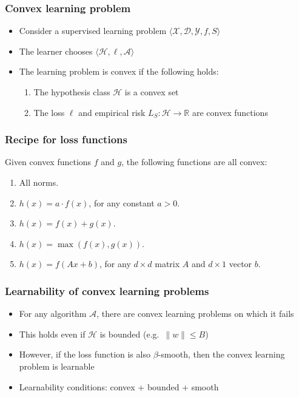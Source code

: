 \documentclass[10pt]{beamer}
\begin{document}
\begin{frame}
  \frametitle{Convex learning problem}
  \begin{itemize}
	\item Consider a supervised learning problem $\langle \mathcal{X},\mathcal{D},\mathcal{Y},f,S\rangle$
	\item The learner chooses $\langle \mathcal{H}, \ell, \mathcal{A} \rangle$
	\item The learning problem is {\color{red} convex} if the following holds:
	\begin{enumerate}
	\item The hypothesis class $\mathcal{H}$ is a {\color{red} convex set}
	\item The loss $\ell$ and empirical risk $L_S:\mathcal{H}\rightarrow\mathbb{R}$ are {\color{red} convex functions}
	\end{enumerate}
  \end{itemize}
\end{frame}

\begin{frame}
  \frametitle{Recipe for loss functions}
  Given convex functions $f$ and $g$, the following functions are all convex:
  \begin{enumerate}
	\item All norms.
	\item $h(x) = a\cdot f(x)$, for any constant $a>0$.
	\item $h(x) = f(x) + g(x)$.
	\item $h(x) = \max(f(x),g(x))$.
	\item $h(x) = f(Ax + b)$, for any $d\times d$ matrix $A$ and $d\times 1$ vector $b$.
  \end{enumerate}
\end{frame}

\begin{frame}
  \frametitle{Learnability of convex learning problems}
  \begin{itemize}
	\item For any algorithm $\mathcal{A}$, there are convex learning problems on which it fails
	\item This holds even if $\mathcal{H}$ is bounded (e.g.~$\lVert w\rVert \leq B$)
	\item However, if the loss function is also $\beta$-smooth, then the convex learning problem is learnable
	\item Learnability conditions: {\color{red} convex} + {\color{blue} bounded} + {\color{green} smooth}
  \end{itemize}
\end{frame}
\end{document}

